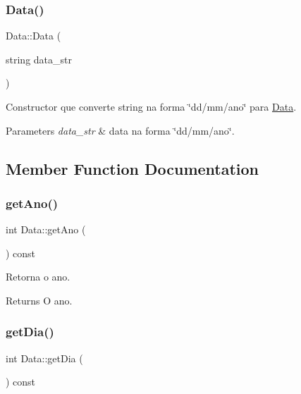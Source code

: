 \hypertarget{class_data_aeddc16ade8663cd89c17624b80a67d4f}{}\label{class_data_aeddc16ade8663cd89c17624b80a67d4f} 
\subsubsection{\texorpdfstring{Data()}{Data()}\hspace{0.1cm}{\footnotesize\ttfamily [3/3]}}
{\footnotesize\ttfamily Data\+::\+Data (\begin{DoxyParamCaption}\item[{string}]{data\+\_\+str }\end{DoxyParamCaption})}



Constructor que converte string na forma \char`\"{}dd/mm/ano\char`\"{} para \hyperlink{class_data}{Data}. 


\begin{DoxyParams}{Parameters}
{\em data\+\_\+str} & data na forma \char`\"{}dd/mm/ano\char`\"{}. \\
\hline
\end{DoxyParams}


\subsection{Member Function Documentation}
\hypertarget{class_data_a986bec10cbca338f08c9096d8e51efb5}{}\label{class_data_a986bec10cbca338f08c9096d8e51efb5} 
\subsubsection{\texorpdfstring{get\+Ano()}{getAno()}}
{\footnotesize\ttfamily int Data\+::get\+Ano (\begin{DoxyParamCaption}{ }\end{DoxyParamCaption}) const}



Retorna o ano. 

\begin{DoxyReturn}{Returns}
O ano. 
\end{DoxyReturn}
\hypertarget{class_data_aa9b7bdc683d9c493d903184e85f1e6b3}{}\label{class_data_aa9b7bdc683d9c493d903184e85f1e6b3} 
\subsubsection{\texorpdfstring{get\+Dia()}{getDia()}}
{\footnotesize\ttfamily int Data\+::get\+Dia (\begin{DoxyParamCaption}{ }\end{DoxyParamCaption}) const}



